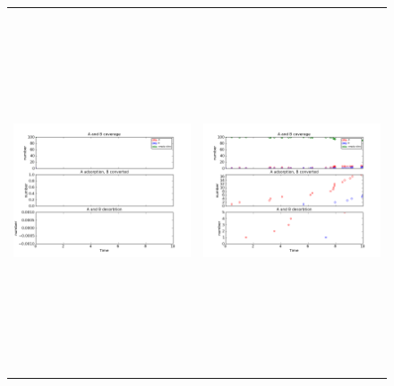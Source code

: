 \documentclass[11pt]{article}
\begin{document}
\setlength{\unitlength}{1in}
\begin{figure}[h!]
\begin{tabular}{cc}
\includegraphics[width=3.5in, height=4.2in]{./coadsorb_irreversible/AtoBirreversible10x10_101_Aabs2x_EA10E3_EB5E3_3.png} &
\includegraphics[width=3.5in, height=4.2in]{./coadsorb_irreversible/AtoBirreversible10x10_201_Aabs2x_EA10E3_EB5E3_3.png} \\

\end{tabular}
\end{figure}
\end{document}
